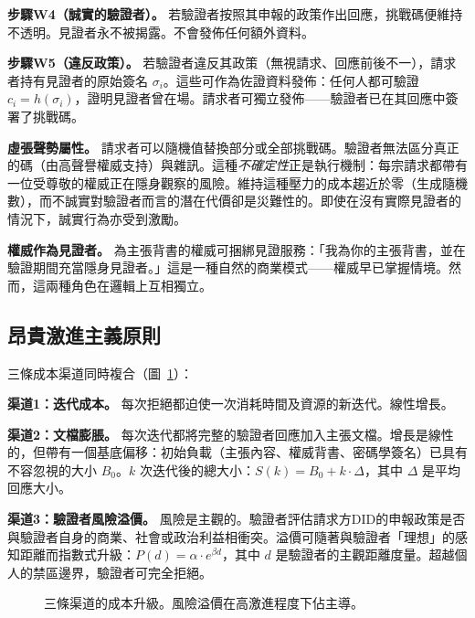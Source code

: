 \documentclass[11pt,a4paper,twocolumn]{article}
\begin{document}
\textbf{步驟W4（誠實的驗證者）。} 若驗證者按照其申報的政策作出回應，挑戰碼便維持不透明。見證者永不被揭露。不會發佈任何額外資料。

\textbf{步驟W5（違反政策）。} 若驗證者違反其政策（無視請求、回應前後不一），請求者持有見證者的原始簽名 $\sigma_i$。這些可作為佐證資料發佈：任何人都可驗證 $c_i = h(\sigma_i)$，證明見證者曾在場。請求者可獨立發佈——驗證者已在其回應中簽署了挑戰碼。

\textbf{虛張聲勢屬性。} 請求者可以隨機值替換部分或全部挑戰碼。驗證者無法區分真正的碼（由高聲譽權威支持）與雜訊。這種\emph{不確定性}正是執行機制：每宗請求都帶有一位受尊敬的權威正在隱身觀察的風險。維持這種壓力的成本趨近於零（生成隨機數），而不誠實對驗證者而言的潛在代價卻是災難性的。即使在沒有實際見證者的情況下，誠實行為亦受到激勵。

\textbf{權威作為見證者。} 為主張背書的權威可捆綁見證服務：「我為你的主張背書，並在驗證期間充當隱身見證者。」這是一種自然的商業模式——權威早已掌握情境。然而，這兩種角色在邏輯上互相獨立。

\subsection{昂貴激進主義原則}

三條成本渠道同時複合（圖~\ref{fig:radicalism}）：

\textbf{渠道1：迭代成本。} 每次拒絕都迫使一次消耗時間及資源的新迭代。線性增長。

\textbf{渠道2：文檔膨脹。} 每次迭代都將完整的驗證者回應加入主張文檔。增長是線性的，但帶有一個基底偏移：初始負載（主張內容、權威背書、密碼學簽名）已具有不容忽視的大小 $B_0$。$k$ 次迭代後的總大小：$S(k) = B_0 + k \cdot \Delta$，其中 $\Delta$ 是平均回應大小。

\textbf{渠道3：驗證者風險溢價。} 風險是主觀的。驗證者評估請求方DID的申報政策是否與驗證者自身的商業、社會或政治利益相衝突。溢價可隨著與驗證者「理想」的感知距離而指數式升級：$P(d) = \alpha \cdot e^{\beta d}$，其中 $d$ 是驗證者的主觀距離度量。超越個人的禁區邊界，驗證者可完全拒絕。

\begin{figure}[ht]
\centering
{}
\caption{三條渠道的成本升級。風險溢價在高激進程度下佔主導。}
\label{fig:radicalism}
\end{figure}
\end{document}
